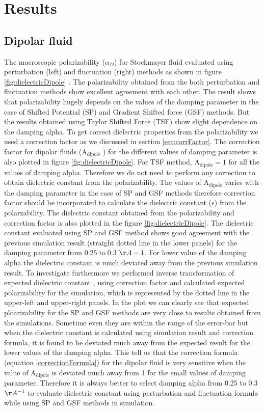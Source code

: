 \section{Results}
\subsection{Dipolar fluid}
The macroscopic polarizability ($\alpha_D$) for Stockmayer fluid evaluated using perturbation (left) and fluctuation (right) methods as shown in figure \ref{fig:dielectricDipole} . The polarizability obtained from the both perturbation and fluctuation methods show excellent agreement with each other. The result shows that polarizability hugely depends on the values of the damping parameter in the case of Shifted Potential (SP) and Gradient Shifted force (GSF) methods. But the results obtained using Taylor Shifted Force (TSF) show slight dependence on the damping alpha.  To get correct dielectric properties from the polarizability we used a correction factor as we discussed in section \ref{sec:corrFactor}. The correction factor for dipolar fluids ($\mathrm{A}_\mathrm{dipole}$ ) for the different values of damping parameter is also plotted in figure \ref{fig:dielectricDipole}. For TSF method, $ \mathrm{A}_\mathrm{dipole} = 1 $ for all the values of damping alpha. Therefore we do not need to perform any correction to obtain dielectric constant from the polarizability. The values of $\mathrm{A}_\mathrm{dipole} $ varies with the damping parameter in the case of SP and GSF methods therefore correction factor should be incorporated to calculate the dielectric constant ($\epsilon$) from the polarzability. The dielectric constant obtained from the polarizability and correction factor is also plotted in the figure \ref{fig:dielectricDipole}. The dielectric constant evaluated using SP and GSF method shows good agreement with the previous simulation result (straight dotted line in the lower panels)\cite{NeumannI83} for the damping parameter from $0.25\; \mathrm{to}\; 0.3$ $\AA-1$. For lower value of the damping alpha the dielectric constant is much deviated away from the previous simulation result. To investigate furthermore we performed inverse transformation of expected dielectric constant \cite{NeumannI83}, using correction factor and calculated expected polarizability for the simulation, which is represented by the dotted line in the upper-left and upper-right panels. In the plot we can clearly see that expected ploarizability for the SP and GSF methods are very close to results obtained from the simulations. Sometime even they are within the range of the error-bar but when the dielectric constant is calculated using simulation result and correction formula, it is found to be deviated much away from the expected result for the lower values of the damping alpha. This tell us that the correction formula (equation \ref{correctionFormula}) for the dipolar fluid is very sensitive when the value of $\mathrm{A}_\mathrm{dipole}$ is deviated much away from 1 for the small values of damping parameter. Therefore it is always better to select damping alpha from 0.25 to 0.3 $\AA^{-1}$ to evaluate dielectric constant using perturbation and fluctuation formula while using SP and GSF methods in simulation.    

